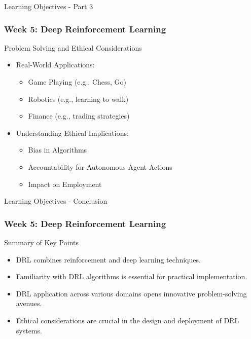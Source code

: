 \documentclass[aspectratio=169]{beamer}
\begin{document}
\begin{frame}[fragile]{Learning Objectives - Part 3}
    \frametitle{Week 5: Deep Reinforcement Learning}
    
    \begin{block}{Problem Solving and Ethical Considerations}
        \begin{itemize}
            \item Real-World Applications:
                \begin{itemize}
                    \item Game Playing (e.g., Chess, Go)
                    \item Robotics (e.g., learning to walk)
                    \item Finance (e.g., trading strategies)
                \end{itemize}
            \item Understanding Ethical Implications:
                \begin{itemize}
                    \item Bias in Algorithms
                    \item Accountability for Autonomous Agent Actions
                    \item Impact on Employment
                \end{itemize}
        \end{itemize}
    \end{block}
\end{frame}

\begin{frame}[fragile]{Learning Objectives - Conclusion}
    \frametitle{Week 5: Deep Reinforcement Learning}
    
    \begin{block}{Summary of Key Points}
        \begin{itemize}
            \item DRL combines reinforcement and deep learning techniques.
            \item Familiarity with DRL algorithms is essential for practical implementation.
            \item DRL application across various domains opens innovative problem-solving avenues.
            \item Ethical considerations are crucial in the design and deployment of DRL systems.
        \end{itemize}
    \end{block}
\end{frame}
\end{document}
